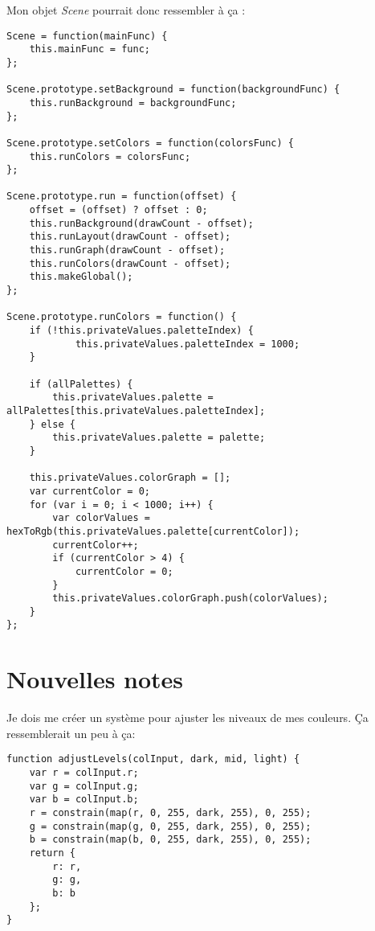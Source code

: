 Mon objet \textit{Scene} pourrait donc ressembler à ça :
\begin{lstlisting}
Scene = function(mainFunc) {
    this.mainFunc = func;
};

Scene.prototype.setBackground = function(backgroundFunc) {
    this.runBackground = backgroundFunc;
};

Scene.prototype.setColors = function(colorsFunc) {
    this.runColors = colorsFunc;
};

Scene.prototype.run = function(offset) {
    offset = (offset) ? offset : 0;
    this.runBackground(drawCount - offset);
    this.runLayout(drawCount - offset);
    this.runGraph(drawCount - offset);
    this.runColors(drawCount - offset);
    this.makeGlobal();
};

Scene.prototype.runColors = function() {
    if (!this.privateValues.paletteIndex) {
            this.privateValues.paletteIndex = 1000;
    }

    if (allPalettes) {
        this.privateValues.palette = allPalettes[this.privateValues.paletteIndex];
    } else {
        this.privateValues.palette = palette;
    }

    this.privateValues.colorGraph = [];
    var currentColor = 0;
    for (var i = 0; i < 1000; i++) {
        var colorValues = hexToRgb(this.privateValues.palette[currentColor]);
        currentColor++;
        if (currentColor > 4) {
            currentColor = 0;
        }
        this.privateValues.colorGraph.push(colorValues);
    }
};
\end{lstlisting}

\clearpage
\section{Nouvelles notes}
Je dois me créer un système pour ajuster les niveaux de mes couleurs. Ça ressemblerait un peu à ça:

\begin{lstlisting}
function adjustLevels(colInput, dark, mid, light) {
    var r = colInput.r;
    var g = colInput.g;
    var b = colInput.b;
    r = constrain(map(r, 0, 255, dark, 255), 0, 255);
    g = constrain(map(g, 0, 255, dark, 255), 0, 255);
    b = constrain(map(b, 0, 255, dark, 255), 0, 255);
    return {
        r: r, 
        g: g, 
        b: b
    };
}
\end{lstlisting}

